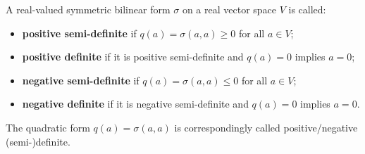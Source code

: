A real-valued symmetric bilinear form $\sigma$ on a real vector space $V$ is called:
\begin{itemize}
\item \textbf{positive semi-definite} if $q(a) = \sigma(a, a) \geq 0$ for all $a \in V$;
\item \textbf{positive definite} if it is positive semi-definite and $q(a) = 0$ implies $a = 0$;
\item \textbf{negative semi-definite} if $q(a) = \sigma(a, a) \leq 0$ for all $a \in V$;
\item \textbf{negative definite} if it is negative semi-definite and $q(a) = 0$ implies $a = 0$.
\end{itemize}

The quadratic form $q(a) = \sigma(a, a)$ is correspondingly called positive/negative (semi-)definite.
